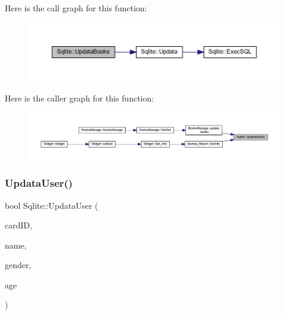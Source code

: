 Here is the call graph for this function\+:
\nopagebreak
\begin{figure}[H]
\begin{center}
\leavevmode
\includegraphics[width=350pt]{class_sqlite_a233ae80bda6616c5aacbffcc1dd80c8c_cgraph}
\end{center}
\end{figure}
Here is the caller graph for this function\+:
\nopagebreak
\begin{figure}[H]
\begin{center}
\leavevmode
\includegraphics[width=350pt]{class_sqlite_a233ae80bda6616c5aacbffcc1dd80c8c_icgraph}
\end{center}
\end{figure}
\mbox{\label{class_sqlite_aba86a5371a532d0c7600f9a70c2d00a5}} 
\subsubsection{\texorpdfstring{UpdataUser()}{UpdataUser()}}
{\footnotesize\ttfamily bool Sqlite\+::\+Updata\+User (\begin{DoxyParamCaption}\item[{Q\+String}]{card\+ID,  }\item[{Q\+String}]{name,  }\item[{Q\+String}]{gender,  }\item[{int}]{age }\end{DoxyParamCaption})}

